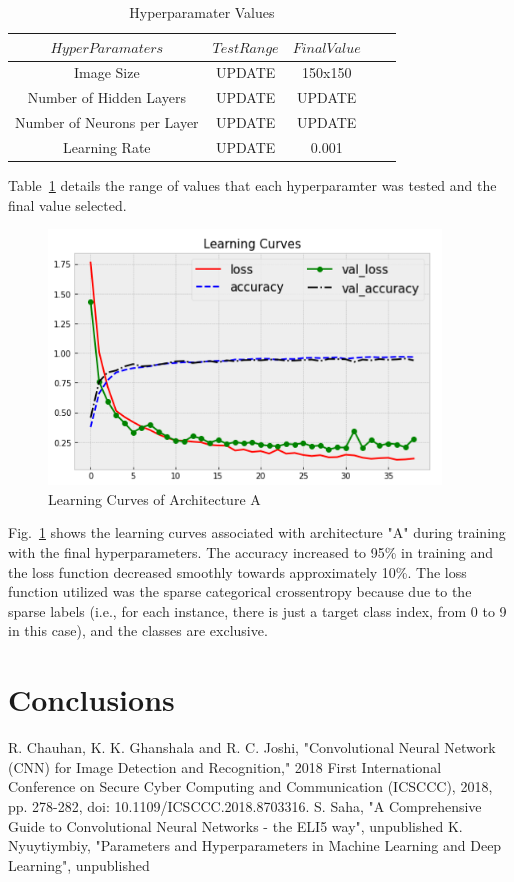 \documentclass[conference]{IEEEtran}
\begin{document}
\begin{table}[htbp]
\caption{Hyperparamater Values}
\label{table_hyp}\centering
\begin{tabular}{ccccc}
\hline
$HyperParamaters$&$Test Range$&$Final Value$\\
\hline
Image Size&UPDATE&150x150\\
Number of Hidden Layers&UPDATE&UPDATE\\
Number of Neurons per Layer&UPDATE&UPDATE\\
Learning Rate&UPDATE&0.001\\
\hline
\end{tabular}
\end{table}

Table~\ref{table_hyp} details the range of values that each hyperparamter was tested and the final value selected.

\begin{figure}[h]
\centerline{\includegraphics{LearningCurves.png}}
\caption{Learning Curves of Architecture A}
\label{fig_Learn}
\end{figure}

Fig.~\ref{fig_Learn} shows the learning curves associated with architecture "A" during training with the final hyperparameters. The accuracy increased to 95\% in training and the loss function decreased smoothly towards approximately 10\%. The loss function utilized was the sparse categorical crossentropy because due to the sparse labels (i.e., for
each instance, there is just a target class index, from 0 to 9 in this case), and the classes are exclusive.

\section{Conclusions}

\begin{thebibliography}{00}
 R. Chauhan, K. K. Ghanshala and R. C. Joshi, "Convolutional Neural Network (CNN) for Image Detection and Recognition," 2018 First International Conference on Secure Cyber Computing and Communication (ICSCCC), 2018, pp. 278-282, doi: 10.1109/ICSCCC.2018.8703316.
 S. Saha, "A Comprehensive Guide to Convolutional Neural Networks - the ELI5 way", unpublished
 K. Nyuytiymbiy, "Parameters and Hyperparameters in Machine Learning and Deep Learning", unpublished
\end{thebibliography}
\end{document}
